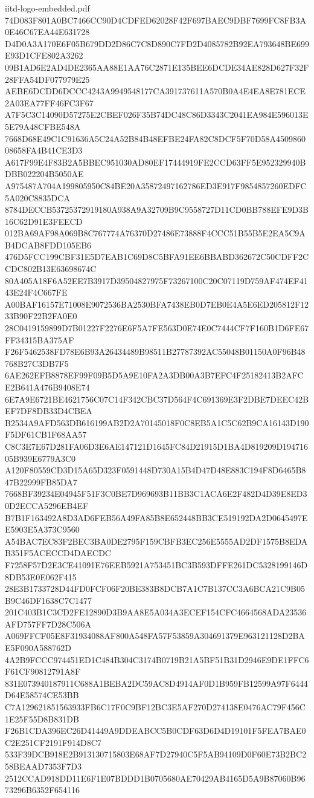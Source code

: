 \begin{filecontents*}[overwrite]{iitd-logo-embedded.pdf}
74D083F801A0BC7466CC90D4CDFED62028F42F697BAEC9DBF7699FC8FB3A0E46C67EA44E631728
D4D0A3A170E6F05B679DD2D86C7C8D890C7FD2D4085782B92EA793648BE699E93D1CFE802A3262
09B1AD6E2AD4DE2365AA88E1AA76C2871E135BEE6DCDE34AE828D627F32F28FFA54DF077979E25
AEBE6DCDD6DCCC4243A9949548177CA391737611A570B0A4E4EA8E781ECE2A03EA77FF46FC3F67
A7F5C3C14090D57275E2CBEF026F35B74DC48C86D3343C2041EA984E596013E5E79A48CFBE548A
7668D68E49C1C91636A5C24A52B84B48EFBE24FA82C8DCF5F70D58A450986008658FA4B41CE3D3
A617F99E4F83B2A5BBEC951030AD80EF17444919FE2CCD63FF5E952329940BDBB022204B5050AE
A975487A704A199805950C84BE20A35872497162786ED3E917F9854857260EDFC5A020C8835DCA
8784DECCB53725372919180A938A9A32709B9C9558727D11CD0BB788EFE9D3B16C62D91E3FEECD
012BA69AF98A069B8C767774A76370D27486E73888F4CCC51B55B5E2EA5C9AB4DCAB8FDD105EB6
476D5FCC199CBF31E5D7EAB1C69D8C5BFA91EE6BBABD362672C50CDFF2CCDC802B13E63698674C
80A405A18F6A52EE7B3917D39504827975F73267100C20C07119D759AF474EF4143E24F4C667FE
A00BAF16157E71008E9072536BA2530BFA7438EB0D7EB0E4A5E6ED205812F1233B90F22B2FA0E0
28C0419159899D7B01227F2276E6F5A7FE563D0E74E0C7444CF7F160B1D6FE67FF34315BA375AF
F26F5462538FD78E6B93A26434489B98511B27787392AC55048B01150A0F96B48768B27C3DB7F5
6AE262EFB8878EF99F09B5D5A9E10FA2A3DB00A3B7EFC4F25182413B2AFCE2B641A476B9408E74
6E7A9E6721BE4621756C07C14F342CBC37D564F4C691369E3F2DBE7DEEC42BEF7DF8DB33D4CBEA
B2534A9AFD563DB616199AB2D2A70145018F0C8EB5A1C5C62B9CA16143D190F5DF61CB1F68AA57
C8C3E7E67D281FA06D3E6AE147121D1645FC84D21915D1BA4D819209D19471605B939E6779A3C0
A120F80559CD3D15A65D323F0591448D730A15B4D47D48E883C194F8D6465B847B22999FB85DA7
7668BF39234E04945F51F3C0BE7D969693B11BB3C1ACA6E2F482D4D39E8ED30D2ECCA5296EB4EF
B7B1F163492A8D3AD6FEB56A49FA85B8E652448BB3CE519192DA2D0645497EE5903E5A373C9560
A54BAC7EC83F2BEC3BA0DE2795F159CBFB3EC256E5555AD2DF1575B8EDAB351F5ACECCD4DAECDC
F7258F57D2E3CE41091E76EEB5921A753451BC3B593DFFE261DC5328199146D8DB53E0E062F415
28E3B1733728D44FD0FCF06F20BE383B8DCB7A1C7B137CC3A6BCA21C9B05B9C46DF1638C7C1477
201C403B1C3CD2FE12890D3B9AA8E5A034A3ECEF154CFC4664568ADA23536AFD757FF7D28C506A
A069FFCF05E8F31934088AF800A548FA57F53859A304691379E963121128D2BAE5F090A588762D
4A2B9FCCC974451ED1C484B304C3174B0719B21A5BF51B31D2946E9DE1FFC6F61CF90812791A8F
831E073940187911C688A1BEBA2DC59AC8D4914AF0D1B959FB12599A97F6444D64E58574CE53BB
C7A129621851563933FB6C17F0C9BF12BC3E5AF270D274138E0476AC79F456C1E25F55D8B831DB
F26B1CDA396EC26D41449A9DDEABCC5B0CDF63D6D4D19101F5FEA7BAE0C2E251CF2191F914D8C7
533F39DCB918E2B913130715803E68AF7D27940C5F5AB94109D0F60E73B2BC258BEAAD7353F7D3
2512CCAD918DD11E6F1E07BDDD1B0705680AE70429AB4165D5A9B87060B9673296B6352F654116

\end{filecontents*}
